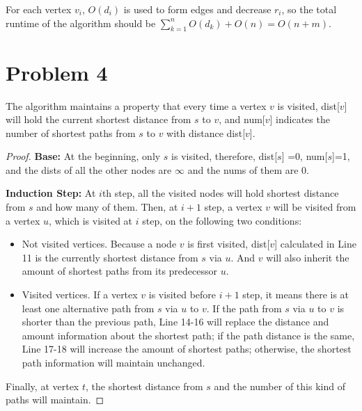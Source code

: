 \documentclass[a4paper,12pt]{article}
\begin{document}
For each vertex $v_i$, $O(d_i)$ is used to form edges and decrease 
$r_i$, so the total runtime of the algorithm should be 
$\sum\limits_{k=1}^n O(d_k) + O(n)= O(n+m)$.
\clearpage
\section*{Problem 4}
The algorithm maintains a property that every time a vertex $v$ is 
visited, dist[$v$] will hold the current shortest distance from $s$ to
$v$, and num[$v$] indicates the number of shortest paths from $s$
to $v$ with distance dist[$v$].

%

\begin{proof}
\textbf{Base:} At the beginning, only $s$ is visited, therefore, dist[$s$]
=0, num[$s$]=1, and the dists of all the other nodes are $\infty$ and
the nums of them are 0.

\textbf{Induction Step:} At $i$th step, all the visited nodes will hold 
shortest distance from $s$ and how many of them. Then, at $i+1$ step,
a vertex $v$ will be visited from a vertex $u$, which is visited at $i$ 
step, on the following two conditions:

\begin{itemize}
    \item Not visited vertices. Because a node $v$ is first visited, dist[$v$]
    calculated in Line 11 is the currently shortest distance from $s$ via 
    $u$. And $v$ will also inherit the amount of shortest paths from its
    predecessor $u$.
    \item Visited vertices. If a vertex $v$ is visited before $i+1$ step, it
    means there is at least one alternative path from $s$ via $u$ to $v$.
    If the path from $s$ via $u$ to $v$ is shorter than the previous path,
    Line 14-16 will replace the distance and amount information about
    the shortest path; if the path distance is the same, Line 17-18 will 
    increase the amount of shortest paths; otherwise, the shortest path
    information will maintain unchanged.
\end{itemize}

Finally, at vertex $t$, the shortest distance from $s$ and the number of
this kind of paths will maintain.
\end{proof}
\end{document}
